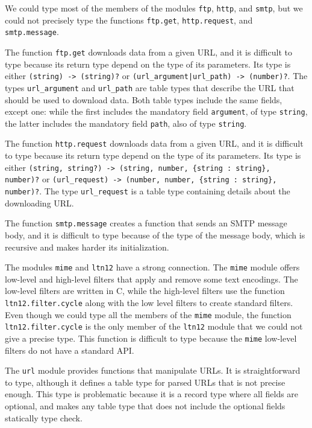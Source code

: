 We could type most of the members of the modules \texttt{ftp},
\texttt{http}, and \texttt{smtp}, but we could not precisely type
the functions \texttt{ftp.get}, \texttt{http.request}, and
\texttt{smtp.message}.

The function \texttt{ftp.get} downloads data from a given URL,
and it is difficult to type because its return type depend on
the type of its parameters.
Its type is either \texttt{(string) -> (string)?} or
\texttt{(url\string_argument|url\string_path) -> (number)?}.
The types \texttt{url\string_argument} and \texttt{url\string_path}
are table types that describe the URL that should be used to
download data.
Both table types include the same fields, except one:
while the first includes the mandatory field \texttt{argument},
of type \texttt{string}, the latter includes the mandatory field
\texttt{path}, also of type \texttt{string}.

The function \texttt{http.request} downloads data from a given URL,
and it is difficult to type because its return type depend on
the type of its parameters.
Its type is either
\texttt{(string, string?) -> (string, number, \{string : string\}, number)?} or
\texttt{(url\string_request) -> (number, number, \{string : string\}, number)?}.
The type \texttt{url\string_request} is a table type containing
details about the downloading URL.

The function \texttt{smtp.message} creates a function that sends
an SMTP message body, and it is difficult to type because of the
type of the message body, which is recursive and makes harder
its initialization.

The modules \texttt{mime} and \texttt{ltn12} have a strong connection.
The \texttt{mime} module offers low-level and high-level filters
that apply and remove some text encodings.
The low-level filters are written in C, while the high-level filters
use the function \texttt{ltn12.filter.cycle} along with the low level
filters to create standard filters.
Even though we could type all the members of the \texttt{mime} module,
the function \texttt{ltn12.filter.cycle} is the only member of the
\texttt{ltn12} module that we could not give a precise type.
This function is difficult to type because the \texttt{mime} low-level
filters do not have a standard API.

The \texttt{url} module provides functions that manipulate URLs.
It is straightforward to type, although it defines a table type for
parsed URLs that is not precise enough.
This type is problematic because it is a record type where all
fields are optional, and makes any table type that does not include
the optional fields statically type check.

